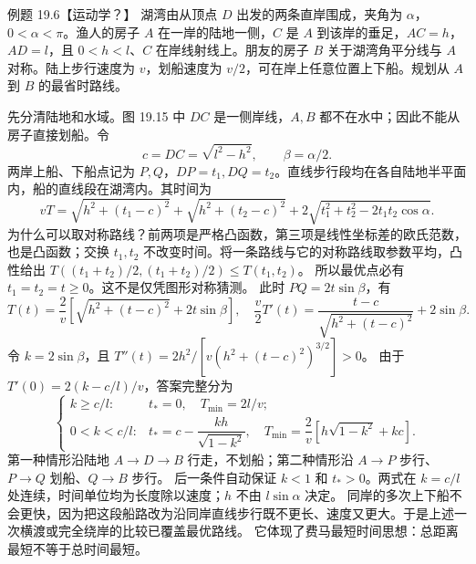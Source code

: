 \FisherPlateDiagram

\begin{origexamplebox}{例题 19.6【运动学？】}
湖湾由从顶点 $D$ 出发的两条直岸围成，夹角为 $\alpha$，$0<\alpha<\pi$。渔人的房子 $A$ 在一岸的陆地一侧，$C$ 是 $A$ 到该岸的垂足，$AC=h$，$AD=l$，且 $0<h<l$、$C$ 在岸线射线上。朋友的房子 $B$ 关于湖湾角平分线与 $A$ 对称。陆上步行速度为 $v$，划船速度为 $v/2$，可在岸上任意位置上下船。规划从 $A$ 到 $B$ 的最省时路线。
\end{origexamplebox}
\begin{xesolution}
先分清陆地和水域。图 19.15 中 $DC$ 是一侧岸线，$A,B$ 都不在水中；因此不能从房子直接划船。令
\[
 c=DC=\sqrt{l^2-h^2},\qquad \beta=\alpha/2.
\]
两岸上船、下船点记为 $P,Q$，$DP=t_1,DQ=t_2$。直线步行段均在各自陆地半平面内，船的直线段在湖湾内。其时间为
\[
 vT=\sqrt{h^2+(t_1-c)^2}+\sqrt{h^2+(t_2-c)^2}
 +2\sqrt{t_1^2+t_2^2-2t_1t_2\cos\alpha}.
\]
为什么可以取对称路线？前两项是严格凸函数，第三项是线性坐标差的欧氏范数，也是凸函数；交换 $t_1,t_2$ 不改变时间。将一条路线与它的对称路线取参数平均，凸性给出
$T((t_1+t_2)/2,(t_1+t_2)/2)\le T(t_1,t_2)$。
所以最优点必有 $t_1=t_2=t\ge0$。这不是仅凭图形对称猜测。
此时 $PQ=2t\sin\beta$，有
\[
 T(t)=\frac2v\left[\sqrt{h^2+(t-c)^2}+2t\sin\beta\right],
 \quad
 \frac v2T'(t)=\frac{t-c}{\sqrt{h^2+(t-c)^2}}+2\sin\beta.
\]
令 $k=2\sin\beta$，且
$T''(t)=2h^2/[v(h^2+(t-c)^2)^{3/2}]>0$。
由于 $T'(0)=2(k-c/l)/v$，答案完整分为
\[
 \boxed{\begin{cases}
 k\ge c/l:&t_*=0,\quad T_{\min}=2l/v;\\[2pt]
 0<k<c/l:&t_*=c-\dfrac{kh}{\sqrt{1-k^2}},\quad
 T_{\min}=\dfrac2v\left[h\sqrt{1-k^2}+kc\right].
 \end{cases}}
\]
第一种情形沿陆地 $A\to D\to B$ 行走，不划船；第二种情形沿 $A\to P$ 步行、$P\to Q$ 划船、$Q\to B$ 步行。
后一条件自动保证 $k<1$ 和 $t_*>0$。两式在 $k=c/l$ 处连续，时间单位均为长度除以速度；$h$ 不由 $l\sin\alpha$ 决定。
同岸的多次上下船不会更快，因为把这段船路改为沿同岸直线步行既不更长、速度又更大。于是上述一次横渡或完全绕岸的比较已覆盖最优路线。
它体现了费马最短时间思想：总距离最短不等于总时间最短。
\end{xesolution}

